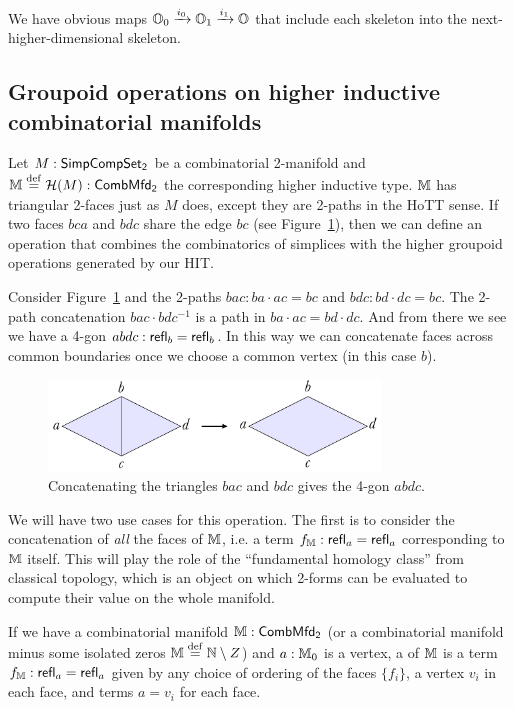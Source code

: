 We have obvious maps \( \mathbb{O}_0\xrightarrow[]{i_0} \mathbb{O}_1\xrightarrow[]{i_1} \mathbb{O} \) that include each skeleton into the next-higher-dimensional skeleton.

\subsection{Groupoid operations on higher inductive combinatorial manifolds}

Let \( M:\mathsf{SimpCompSet_2} \) be a combinatorial 2-manifold and \( \mathbb{M}\stackrel{\mathrm{def}}{=}\mathcal{H}(M):\mathsf{CombMfd_2} \) the corresponding higher inductive type. \( \mathbb{M} \) has triangular 2-faces just as \( M \) does, except they are 2-paths in the HoTT sense. If two faces \( bca \) and \( bdc \) share the edge \( bc \) (see Figure~\ref{fig:concat}), then we can define an operation that combines the combinatorics of simplices with the higher groupoid operations generated by our HIT. 

Consider Figure~\ref{fig:concat} and the 2-paths \( bac: ba\cdot ac=bc \) and \( bdc: bd\cdot dc = bc \). The 2-path concatenation \( bac\cdot bdc^{-1} \) is a path in \( ba\cdot ac = bd\cdot dc \). And from there we see we have a 4-gon \( abdc:\mathsf{refl}_b=\mathsf{refl}_b \). In this way we can concatenate faces across common boundaries once we choose a common vertex (in this case \( b \)).

\begin{figure}[htbp]
\centering
\includegraphics[width=250pt]{concat.pdf}
\caption{Concatenating the triangles \( bac \) and \( bdc \) gives the 4-gon \( abdc \).}
\label{fig:concat}
\end{figure}

We will have two use cases for this operation. The first is to consider the concatenation of \emph{all} the faces of \( \mathbb{M} \), i.e. a term \( f_{\mathbb{M}}:\mathsf{refl}_a=\mathsf{refl}_a \) corresponding to \( \mathbb{M} \) itself. This will play the role of the ``fundamental homology class'' from classical topology, which is an object on which 2-forms can be evaluated to compute their value on the whole manifold. 

\begin{mydef}
\label{def:totalface}
If we have a combinatorial manifold \( \mathbb{M}:\mathsf{CombMfd_2} \) (or a combinatorial manifold minus some isolated zeros \( \mathbb{M}\stackrel{\mathrm{def}}{=}\mathbb{N}\setminus Z \)) and \( a:\mathbb{M}_0 \) is a vertex, a  of \( \mathbb{M} \) is a term \( f_{\mathbb{M}}:\mathsf{refl}_a=\mathsf{refl}_a \) given by any choice of ordering of the faces \( \{f_i\} \), a vertex \( v_i \) in each face, and terms \( a=v_i \) for each face.
\end{mydef}

